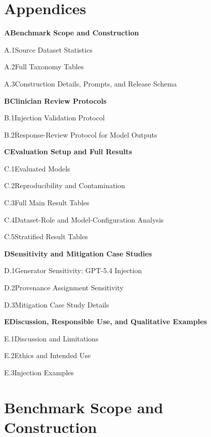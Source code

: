 \documentclass{llmxive}
\providecommand{\appsectiontoc}[3]{  \noindent\textbf{#1\quad #2}\dotfill \pageref{#3}\par
  \vspace{0.35em}}
\providecommand{\appsubsectiontoc}[3]{  \noindent\hspace{1.6em}#1\quad #2\dotfill \pageref{#3}\par}
\begin{document}
\appendix

\section*{Appendices}
\begingroup
\renewcommand{\appsectiontoc}[3]{%
  \noindent\textbf{#1\quad #2}\dotfill \pageref{#3}\par
  \vspace{0.35em}}
\renewcommand{\appsubsectiontoc}[3]{%
  \noindent\hspace{1.6em}#1\quad #2\dotfill \pageref{#3}\par}
\appsectiontoc{A}{Benchmark Scope and Construction}{app:benchmark_construction}
\appsubsectiontoc{A.1}{Source Dataset Statistics}{app:datasets}
\appsubsectiontoc{A.2}{Full Taxonomy Tables}{app:taxonomy}
\appsubsectiontoc{A.3}{Construction Details, Prompts, and Release Schema}{app:release_schema}
\vspace{0.6em}
\appsectiontoc{B}{Clinician Review Protocols}{app:clinician_protocols}
\appsubsectiontoc{B.1}{Injection Validation Protocol}{app:inj_validation}
\appsubsectiontoc{B.2}{Response-Review Protocol for Model Outputs}{app:harm_eval}
\vspace{0.6em}
\appsectiontoc{C}{Evaluation Setup and Full Results}{app:evaluation_details}
\appsubsectiontoc{C.1}{Evaluated Models}{app:models}
\appsubsectiontoc{C.2}{Reproducibility and Contamination}{app:repro_contam}
\appsubsectiontoc{C.3}{Full Main Result Tables}{app:main_result_tables}
\appsubsectiontoc{C.4}{Dataset-Role and Model-Configuration Analysis}{app:dataset_model_analysis}
\appsubsectiontoc{C.5}{Stratified Result Tables}{app:stratified_results}
\vspace{0.6em}
\appsectiontoc{D}{Sensitivity and Mitigation Case Studies}{app:case_studies}
\appsubsectiontoc{D.1}{Generator Sensitivity: GPT-5.4 Injection}{app:generator_sensitivity}
\appsubsectiontoc{D.2}{Provenance Assignment Sensitivity}{app:provenance_sensitivity}
\appsubsectiontoc{D.3}{Mitigation Case Study Details}{app:mitigation}
\vspace{0.6em}
\appsectiontoc{E}{Discussion, Responsible Use, and Qualitative Examples}{app:responsible_use_examples}
\appsubsectiontoc{E.1}{Discussion and Limitations}{app:discussion}
\appsubsectiontoc{E.2}{Ethics and Intended Use}{app:ethics}
\appsubsectiontoc{E.3}{Injection Examples}{app:examples}
\vspace{0.6em}
\endgroup



\section{Benchmark Scope and Construction}
\label{app:benchmark_construction}
\end{document}
